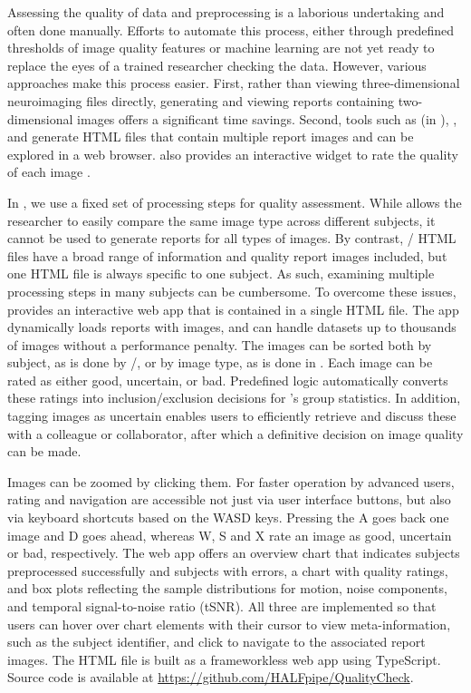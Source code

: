 Assessing the quality of data and preprocessing is a laborious undertaking
and often done manually. Efforts to automate this process, either through
predefined thresholds of image quality features
\parencite{10.1016/j.neuroimage.2017.10.034} or machine learning
\parencite{10.1371/journal.pone.0184661} are not yet ready to replace the eyes
of a trained researcher checking the data. However, various approaches make
this process easier. First, rather than viewing three-dimensional
neuroimaging files directly, generating and viewing reports containing
two-dimensional images offers a significant time savings. Second, tools
such as  (in ), , and 
generate HTML files that contain multiple report images and can be explored
in a web browser.  also provides an interactive widget to rate
the quality of each image \parencite{10.1038/s41597-019-0035-4}.

In , we use a fixed set of processing steps for quality
assessment. While  allows the researcher to easily compare
the same image type across different subjects, it cannot be used to
generate reports for all types of images. By contrast,
/ HTML files have a broad range of information
and quality report images included, but one HTML file is always specific to
one subject. As such, examining multiple processing steps in many subjects
can be cumbersome. To overcome these issues,  provides an
interactive web app that is contained in a single HTML file. The app
dynamically loads reports with images, and can handle datasets up to
thousands of images without a performance penalty. The images can be sorted
both by subject, as is done by /, or by image
type, as is done in . Each image can be rated as either
good, uncertain, or bad. Predefined logic automatically converts these
ratings into inclusion/exclusion decisions for 's group
statistics. In addition, tagging images as uncertain enables users to
efficiently retrieve and discuss these with a colleague or collaborator,
after which a definitive decision on image quality can be made.

Images can be zoomed by clicking them. For faster operation by advanced
users, rating and navigation are accessible not just via user interface
buttons, but also via keyboard shortcuts based on the WASD keys. Pressing
the A goes back one image and D goes ahead, whereas W, S and X rate an
image as good, uncertain or bad, respectively. The web app offers an
overview chart that indicates subjects preprocessed successfully and
subjects with errors, a chart with quality ratings, and box plots
reflecting the sample distributions for motion, noise components, and
temporal signal-to-noise ratio (tSNR). All three are implemented so that
users can hover over chart elements with their cursor to view
meta-information, such as the subject identifier, and click to navigate to
the associated report images. The HTML file is built as a frameworkless web
app using TypeScript. Source code is available at
\url{https://github.com/HALFpipe/QualityCheck}.

